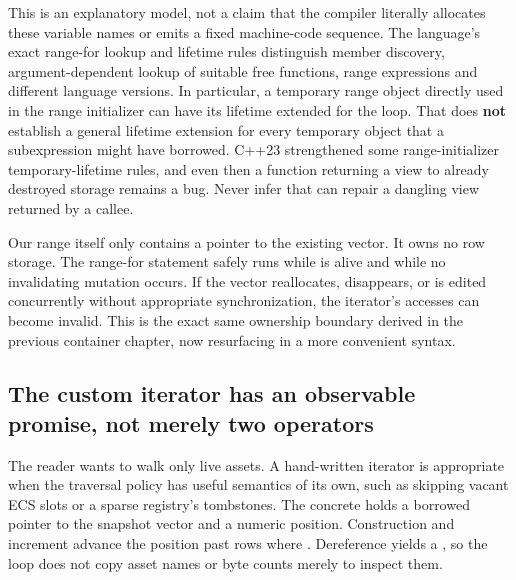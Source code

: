 This is an explanatory model, not a claim that the compiler literally allocates these variable names or emits a fixed machine-code sequence. The language's exact range-for lookup and lifetime rules distinguish member  discovery, argument-dependent lookup of suitable free functions, range expressions and different language versions. In particular, a temporary range object directly used in the range initializer can have its lifetime extended for the loop. That does \textbf{not} establish a general lifetime extension for every temporary object that a subexpression might have borrowed. C++23 strengthened some range-initializer temporary-lifetime rules, and even then a function returning a view to already destroyed storage remains a bug. Never infer that  can repair a dangling view returned by a callee.

Our  range itself only contains a pointer to the existing vector. It owns no row storage. The range-for statement safely runs while  is alive and while no invalidating mutation occurs. If the vector reallocates, disappears, or is edited concurrently without appropriate synchronization, the iterator's accesses can become invalid. This is the exact same ownership boundary derived in the previous container chapter, now resurfacing in a more convenient syntax.

\subsection{The custom iterator has an observable promise, not merely two operators}\label{05-engine-i-ch006-the-custom-iterator-has-an-observable-promise-not-merely-two-operators}

\hypertarget{05-engine-i-ch006-the-custom-iterator-has-an-observable-promise-not-merely-two-operators}{}

The reader wants to walk only live assets. A hand-written iterator is appropriate when the traversal policy has useful semantics of its own, such as skipping vacant ECS slots or a sparse registry's tombstones. The concrete  holds a borrowed pointer to the snapshot vector and a numeric position. Construction and increment advance the position past rows where . Dereference yields a , so the loop does not copy asset names or byte counts merely to inspect them.

